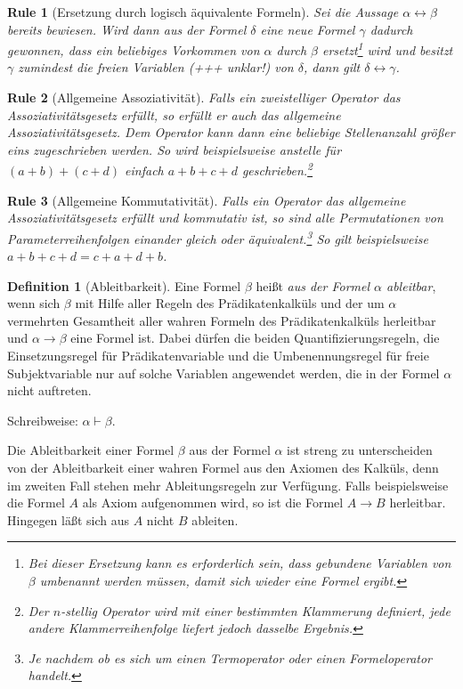 \documentclass[a4paper,german,10pt,twoside]{book}
\newtheorem{rul}{Rule}
\theoremstyle{definition}
\newtheorem{defn}[thm]{Definition}
\theoremstyle{remark}
\begin{document}
\begin{rul}[Ersetzung durch logisch {\"a}quivalente Formeln]
Sei die Aussage $\alpha \leftrightarrow \beta$ bereits bewiesen. Wird dann aus der Formel $\delta$ eine neue
Formel $\gamma$ dadurch gewonnen, dass ein beliebiges Vorkommen von $\alpha$ durch $\beta$
ersetzt\footnote{Bei dieser Ersetzung kann es erforderlich sein, dass gebundene Variablen von
$\beta$ umbenannt werden m{\"u}ssen, damit sich wieder eine Formel ergibt.} wird und besitzt $\gamma$
zumindest die freien Variablen (+++ unklar!) von $\delta$, dann gilt $\delta \leftrightarrow \gamma$.
\end{rul}

\begin{rul}[Allgemeine Assoziativit{\"a}t]
Falls ein zweistelliger Operator das Assoziativit{\"a}tsgesetz erf{\"u}llt, so erf{\"u}llt er auch das
allgemeine Assoziativit{\"a}tsgesetz. Dem Operator kann dann eine beliebige Stellenanzahl gr{\"o}{\ss}er eins
zugeschrieben werden. So wird beispielsweise anstelle f{\"u}r $(a + b) + (c + d)$ einfach $a + b + c +
d$ geschrieben.\footnote{Der $n$-stellig Operator wird mit einer bestimmten Klammerung definiert,
jede andere Klammerreihenfolge liefert jedoch dasselbe Ergebnis.}
\end{rul}

\begin{rul}[Allgemeine Kommutativit{\"a}t]
Falls ein Operator das allgemeine Assoziativit{\"a}tsgesetz erf{\"u}llt und kommutativ ist, so sind alle
Permutationen von Parameterreihenfolgen einander gleich oder {\"a}quivalent.\footnote{Je nachdem ob es
sich um einen Termoperator oder einen Formeloperator handelt.} So gilt beispielsweise $a + b + c +
d  = c + a + d + b$.
\end{rul}

\begin{defn}[Ableitbarkeit]
Eine Formel $\beta$ hei{\ss}t \emph{aus der Formel $\alpha$ ableitbar}, wenn sich $\beta$ mit Hilfe
aller Regeln des Pr{\"a}dikatenkalk{\"u}ls und der um $\alpha$ vermehrten Gesamtheit aller wahren Formeln
des Pr{\"a}dikatenkalk{\"u}ls herleitbar und $\alpha \rightarrow \beta$ eine Formel ist. Dabei d{\"u}rfen die beiden
Quantifizierungsregeln, die Einsetzungsregel f{\"u}r Pr{\"a}dikatenvariable und die Umbenennungsregel f{\"u}r
freie Subjektvariable nur auf solche Variablen angewendet werden, die in der Formel $\alpha$ nicht
auftreten.
\par
Schreibweise: $\alpha \vdash \beta$.
\end{defn}
Die Ableitbarkeit einer Formel $\beta$ aus der Formel $\alpha$ ist streng zu unterscheiden von der
Ableitbarkeit einer wahren Formel aus den Axiomen des Kalk{\"u}ls, denn im zweiten Fall stehen mehr
Ableitungsregeln zur Verf{\"u}gung. Falls beispielsweise die Formel $A$ als Axiom aufgenommen wird, so
ist die Formel $A \rightarrow B$ herleitbar. Hingegen l{\"a}{\ss}t sich aus $A$ nicht $B$ ableiten.
\end{document}
